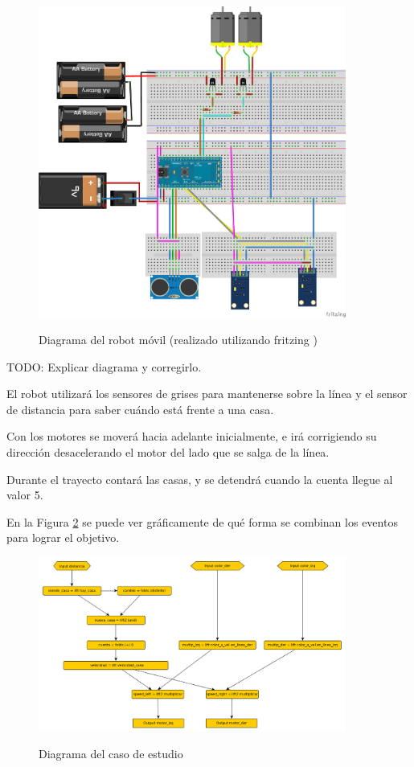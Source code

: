 \begin{figure}[hbtp]
\begin{center}
  \caption{Diagrama del robot móvil
    (realizado utilizando fritzing \cite{fritzing})
  }
\includegraphics[width=0.9\textwidth]{graphs/breaboardbb.png}
\label{fig:deliverybot}
\end{center}
\end{figure}

TODO: Explicar diagrama y corregirlo.

  El robot utilizará los sensores de grises para mantenerse sobre
la línea y el sensor de distancia para saber cuándo está frente
a una casa.

  Con los motores se moverá hacia adelante inicialmente, e irá corrigiendo
  su dirección desacelerando el motor del lado que se salga de la línea.

  Durante el trayecto contará las casas, y se detendrá cuando la cuenta
llegue al valor 5.

  En la Figura \ref{fig:delivery} se puede ver gráficamente de qué forma
se combinan los eventos para lograr el objetivo.

\begin{figure}[hbtp]
\begin{center}
\caption{Diagrama del caso de estudio}
\includegraphics[width=0.9\textwidth]{graphs/delivery.png}
\label{fig:delivery}
\end{center}
\end{figure}

